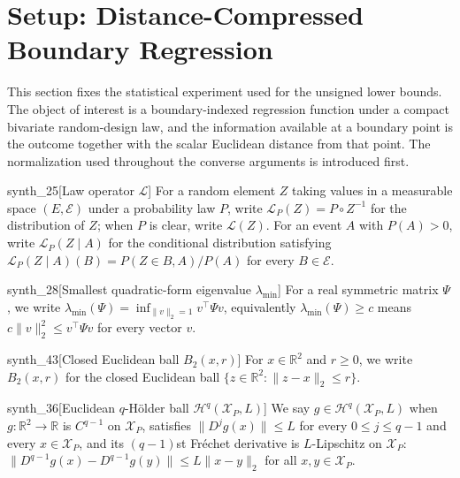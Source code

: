\section{Setup: Distance-Compressed Boundary Regression}
\label{sec:unsigned-setup}

This section fixes the statistical experiment used for the unsigned lower bounds. The object of interest is a boundary-indexed regression function under a compact bivariate random-design law, and the information available at a boundary point is the outcome together with the scalar Euclidean distance from that point. The normalization used throughout the converse arguments is introduced first.

\begin{definitionv}{synth_25}[Law operator $\mathcal L$]
For a random element \(Z\) taking values in a measurable space \((E,\mathcal E)\) under a probability law \(P\), write \(\mathcal L_P(Z)=P\circ Z^{-1}\) for the distribution of \(Z\); when \(P\) is clear, write \(\mathcal L(Z)\). For an event \(A\) with \(P(A)>0\), write \(\mathcal L_P(Z\mid A)\) for the conditional distribution satisfying \(\mathcal L_P(Z\mid A)(B)=P(Z\in B,A)/P(A)\) for every \(B\in\mathcal E\).
\end{definitionv}

\begin{definitionv}{synth_28}[Smallest quadratic-form eigenvalue $\lambda_{\min}$]
For a real symmetric matrix $\Psi$, we write $\lambda_{\min}(\Psi)=\inf_{\|v\|_2=1} v^\top\Psi v$, equivalently $\lambda_{\min}(\Psi)\ge c$ means $c\|v\|_2^2\le v^\top\Psi v$ for every vector $v$.
\end{definitionv}

\begin{definitionv}{synth_43}[Closed Euclidean ball $B_2(x,r)$]
For $x\in\mathbb R^2$ and $r\geq0$, we write $B_2(x,r)$ for the closed Euclidean ball $\{z\in\mathbb R^2:\lVert z-x\rVert_2\leq r\}$.
\end{definitionv}

\begin{definitionv}{synth_36}[Euclidean \(q\)-Hölder ball \(\mathcal H^q(\mathcal X_P,L)\)]
We say \(g\in\mathcal H^q(\mathcal X_P,L)\) when \(g:\mathbb R^2\to\mathbb R\) is \(C^{q-1}\) on \(\mathcal X_P\), satisfies \(\lVert D^j g(x)\rVert\leq L\) for every \(0\leq j\leq q-1\) and every \(x\in\mathcal X_P\), and its \((q-1)\)st Fréchet derivative is \(L\)-Lipschitz on \(\mathcal X_P\): \(\lVert D^{q-1}g(x)-D^{q-1}g(y)\rVert\leq L\lVert x-y\rVert_2\) for all \(x,y\in\mathcal X_P\).
\end{definitionv}

